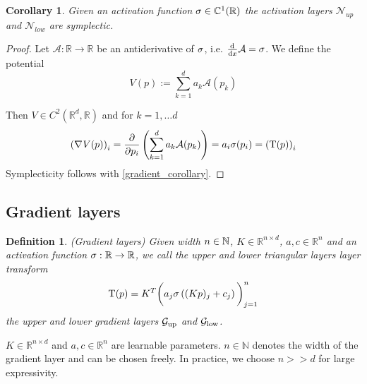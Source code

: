\documentclass[twoside,a4paper]{article}
\newtheorem{definition}{Definition}
\newtheorem{corollary}{Corollary}
\begin{document}
\begin{corollary}
	Given an activation function $\sigma \in \mathbb{C}^1(\mathbb{R})$
	the activation layers $\mathcal{N}_{up}$ and $\mathcal{N}_{low}$ are symplectic.
\end{corollary}
\begin{proof}
	Let $\mathcal{A}: \mathbb{R} \to \mathbb{R}$ be an antiderivative of $\sigma$, 
	i.e. $\frac{\mathrm{d}^{}}{\mathrm{d}x} \mathcal{A} = \sigma$. We define the potential
	\begin{equation*}
		V(p) := \sum_{k=1}^d a_k \mathcal{A}(p_k)
	\end{equation*}

	Then $V \in C^2(\mathbb{R}^d, \mathbb{R})$ and for $k=1, \dots d$
	\begin{equation*}
		\left( \nabla_{}{V}(p) \right)_i = \frac{\partial }{\partial p_i} \left( \sum_{k=1}^d a_k \mathcal{A}(p_k) \right)
		= a_i \sigma(p_i) = \left( \mathrm{T}(p) \right)_i
	\end{equation*}
	Symplecticity follows with \cref{gradient_corollary}.
\end{proof}


\subsection{Gradient layers}

\begin{definition}
	(Gradient layers)
	Given width $n \in \mathbb{N}$, $K \in \mathbb{R}^{n \times d}$, $a,c \in \mathbb{R}^n$ and
	an activation function $\sigma : \mathbb{R} \to \mathbb{R}$,
	we call the upper and lower triangular layers layer transform
	\begin{equation*}
		\mathrm{T}(p) = K^T \bigg( a_j \sigma \left( (Kp)_j + c_j \right) \bigg)_{j=1}^n
	\end{equation*}
	the upper and lower gradient layers $\mathcal{G}_{\text{up}}$ and $\mathcal{G}_{\text{low}}$.
\end{definition}
$K \in \mathbb{R}^{n \times d}$ and $a,c \in \mathbb{R}^n$
are learnable parameters. 
$n \in \mathbb{N}$ denotes the width of the gradient layer and can be chosen freely.
In practice, we choose $n >> d$ for large expressivity.
\end{document}
